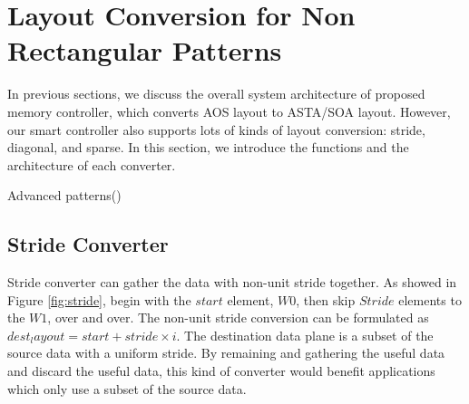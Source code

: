 \documentclass[10pt,journal,compsoc]{IEEEtran}
\begin{document}
\section{Layout Conversion for Non Rectangular Patterns}\label{Special patterns}
In previous sections, we discuss the overall system architecture of proposed memory controller, which converts AOS layout to ASTA/SOA layout. However, our smart controller also supports lots of kinds of layout conversion: stride, diagonal, and sparse. In this section, we introduce the functions and the architecture of each converter.


\begin{algorithm} [h]
\KwIn{
Parameters from memcpySC API}
\KwResult{
Transformed data layout stores in the destination memory}
\caption{Advanced patterns()}
\label{alg:Advanced}
\end{algorithm}






\subsection{Stride Converter} \label{Stride}
Stride converter can gather the data with non-unit stride together. As showed in Figure \ref{fig:stride}, begin with the $  start $ element, $ W0 $, then skip $ Stride $ elements to the  $ W1 $, over and over. The non-unit stride conversion can be formulated as $dest_layout=start+ stride \times i$. The destination data plane is a subset of the source data with a uniform stride. By remaining and gathering the useful data and discard the useful data, this kind of converter would benefit applications which only use a subset of the source data.
\end{document}
